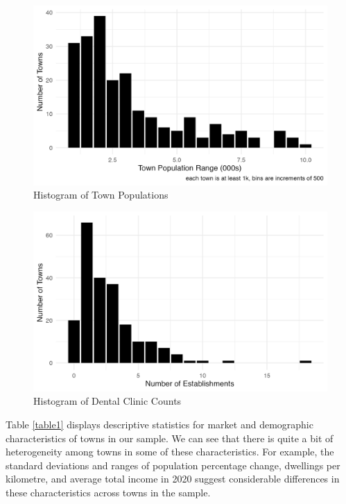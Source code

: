 \documentclass[a4paper,11pt]{article}
\begin{document}
\begin{figure}
    \centering
    \includegraphics[width=0.85\linewidth]{figure2.png}
    \caption{Histogram of Town Populations}
    \label{figure1}
\end{figure}

\begin{figure}
    \centering
    \includegraphics[width=0.85\linewidth]{table2Figure.png}
    \caption{Histogram of Dental Clinic Counts}
    \label{figure2}
\end{figure}

Table \ref{table1} displays descriptive statistics for market and demographic characteristics of towns in our sample. We can see that there is quite a bit of heterogeneity among towns in some of these characteristics. For example, the standard deviations and ranges of population percentage change, dwellings per kilometre, and average total income in 2020 suggest considerable differences in these characteristics across towns in the sample.
\end{document}
